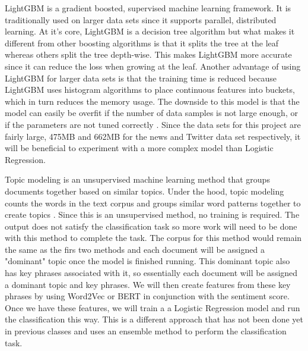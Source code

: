 \documentclass[conference]{IEEEtran}
\begin{document}
LightGBM is a gradient boosted, supervised machine learning framework. It is traditionally used on larger data sets since it supports parallel, distributed learning. At it's core, LightGBM is a decision tree algorithm but what makes it different from other boosting algorithms is that it splits the tree at the leaf whereas others split the tree depth-wise. This makes LightGBM more accurate since it can reduce the loss when growing at the leaf. Another advantage of using LightGBM for larger data sets is that the training time is reduced because LightGBM uses histogram algorithms to place continuous features into buckets, which in turn reduces the memory usage. The downside to this model is that the model can easily be overfit if the number of data samples is not large enough, or if the parameters are not tuned correctly \cite{b12}. Since the data sets for this project are fairly large, 475MB and 662MB for the news and Twitter data set respectively, it will be beneficial to experiment with a more complex model than Logistic Regression.

Topic modeling is an unsupervised machine learning method that groups documents together based on similar topics. Under the hood, topic modeling counts the words in the text corpus and groups similar word patterns together to create topics \cite{b5}. Since this is an unsupervised method, no training is required. The output does not satisfy the classification task so more work will need to be done with this method to complete the task. The corpus for this method would remain the same as the firs two methods and each document will be assigned a "dominant" topic once the model is finished running. This dominant topic also has key phrases associated with it, so essentially each document will be assigned a dominant topic and key phrases. We will then create features from these key phrases by using Word2Vec or BERT in conjunction with the sentiment score. Once we have these features, we will train a a Logistic Regression model and run the classification this way. This is a different approach that has not been done yet in previous classes and uses an ensemble method to perform the classification task.
\end{document}
